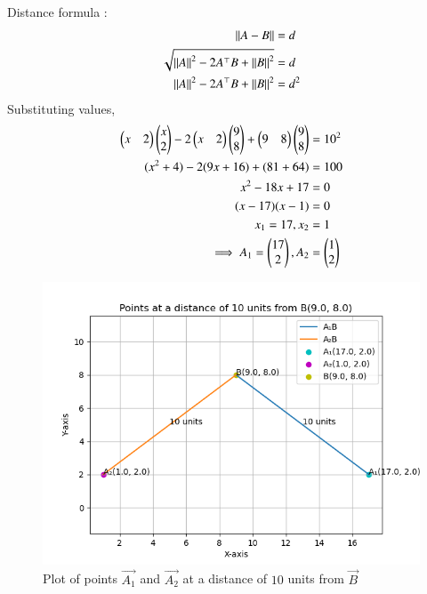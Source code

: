 \documentclass[journal]{IEEEtran}
\begin{document}
Distance formula :
\begin{align}
    \left\lVert A-B\right\rVert&=d \\
    \sqrt{\left\lVert A\right\rVert^2-2A^\top B+\left\lVert B\right\rVert^2}&=d \\
    \left\lVert A\right\rVert^2-2A^\top B+\left\lVert B\right\rVert^2&=d^2
\end{align}
Substituting values,
\begin{align}
    \begin{pmatrix}x&2\end{pmatrix}\begin{pmatrix}x\\2\end{pmatrix}-2\begin{pmatrix}x&2\end{pmatrix}\begin{pmatrix}9\\8\end{pmatrix}+\begin{pmatrix}9&8\end{pmatrix}\begin{pmatrix}9\\8\end{pmatrix}&=10^2 \\
    (x^2+4)-2(9x+16)+(81+64)&=100 \\
	x^2-18x+17&=0 \\
	(x-17)(x-1)&=0 \\
    x_1=17, x_2&=1 \\
    \implies A_1=\begin{pmatrix}17\\2\end{pmatrix}, A_2&=\begin{pmatrix}1\\2\end{pmatrix}
\end{align}
\begin{figure}[ht!]
	\centering
   	\includegraphics[width=0.8\linewidth]{figs/plot.png}
   	\caption{Plot of points $\vec{A_1}$ and $\vec{A_2}$ at a distance of $10$ units from $\vec{B}$}
\label{Plot}
\end{figure}
\end{document}
